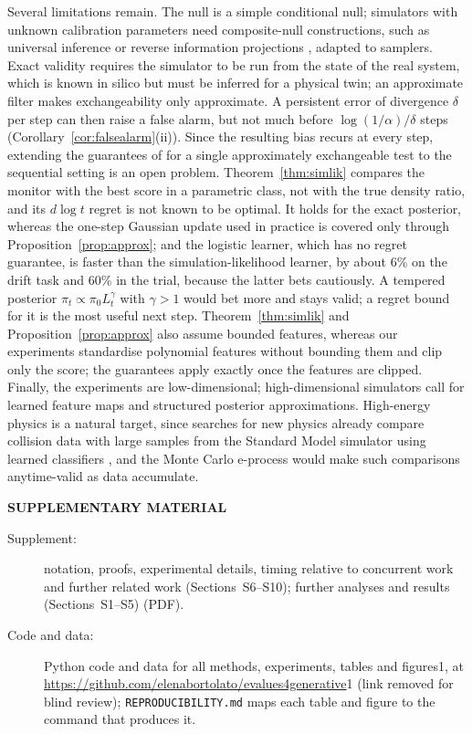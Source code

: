 \documentclass[12pt]{article}
\theoremstyle{remark}
\newcommand{\blind}{1}
\begin{document}
Several limitations remain. The null is a simple conditional null; simulators
with unknown calibration parameters need composite-null constructions, such
as universal inference or reverse information projections
\citep{grunwald2024safe}, adapted to samplers. Exact validity requires the simulator to be run from the state of the real
system, which is known in silico but must be inferred for a physical twin; an
approximate filter makes exchangeability only approximate. A persistent error
of divergence $\delta$ per step can then raise a false alarm, but not much
before $\log(1/\alpha)/\delta$ steps (Corollary~\ref{cor:falsealarm}(ii)).
Since the resulting bias recurs at every step, extending the guarantees of \citet{barber2026montecarlo} for a
single approximately exchangeable test to the sequential setting is an open
problem. Theorem~\ref{thm:simlik} compares the monitor with the best score in
a parametric class, not with the true density ratio, and its $d\log t$ regret
is not known to be optimal. It holds for the exact posterior, whereas the one-step Gaussian update used in
practice is covered only through Proposition~\ref{prop:approx}; and the
logistic learner, which has no regret guarantee, is faster than the
simulation-likelihood learner, by about 6\% on the drift task and 60\% in the
trial, because the latter bets cautiously. A tempered posterior
$\pi_t \propto \pi_0 L_t^{\gamma}$ with $\gamma > 1$
\citep{sinharoy2026prequential} would bet more and stays valid; a regret bound
for it is the most useful next step.
Theorem~\ref{thm:simlik} and Proposition~\ref{prop:approx} also assume bounded
features, whereas our experiments standardise polynomial features without
bounding them and clip only the score; the guarantees apply exactly once the
features are clipped. Finally, the experiments are low-dimensional;
high-dimensional simulators call for learned feature maps and structured
posterior approximations. High-energy physics is a natural target, since
searches for new physics already compare collision data with large samples
from the Standard Model simulator using learned classifiers
\citep{dagnolo2019learning}, and the Monte Carlo e-process would make such
comparisons anytime-valid as data accumulate.

\bigskip
\begin{center}
{\large\bf SUPPLEMENTARY MATERIAL}
\end{center}

\begin{description}
\item[Supplement:] notation, proofs, experimental details, timing relative to
concurrent work and further related work (Sections~S6--S10); further
analyses and results (Sections~S1--S5) (PDF).
\item[Code and data:] Python code and data for all methods, experiments, tables
and figures\blind, at \url{https://github.com/elenabortolato/evalues4generative}\fi{}\blind{} (link removed for blind review)\fi; \texttt{REPRODUCIBILITY.md} maps each table and figure to the
command that produces it.
\end{description}
\end{document}
